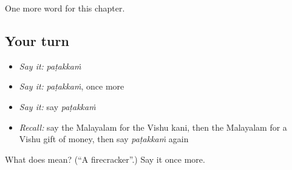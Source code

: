 \begin{grammarlens}[title={What you've built}]
One more word for this chapter.
\end{grammarlens}

\subsection*{Your turn}
\begin{itemize}
\raggedright
  \item \emph{Say it:} \emph{paṭakkaṁ}
  \item \emph{Say it:} \emph{paṭakkaṁ}, once more
  \item \emph{Say it:} say \emph{paṭakkaṁ}
  \item \emph{Recall:} say the Malayalam for the Vishu kani, then the Malayalam for a Vishu gift of money, then say \emph{paṭakkaṁ} again
\end{itemize}

\begin{tcolorbox}[breakable,colback=teal!4,colframe=teal!35!black,title={Before you move on}]
What does  mean? (\textquotedblleft{}A firecracker\textquotedblright{}.) Say it once more.
\end{tcolorbox}

